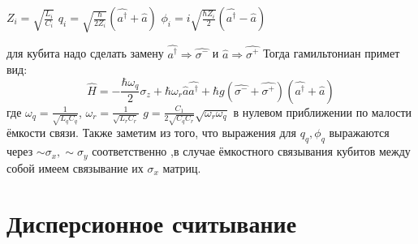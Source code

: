 \documentclass[12pt, twoside]{report}
\begin{document}
\begin{center}
$Z_i=\sqrt{\frac{L_i}{C_i}}$
$q_i=\sqrt{\frac{\hbar}{2Z_i}}(\hat{a^{\dagger}}+\hat{a})$
$\phi_i=i\sqrt{\frac{\hbar Z_i}{2}}(\hat{a^{\dagger}}-\hat{a})$ \\ 
\end{center}
для кубита надо сделать замену  $\hat{a^{\dagger}}\Rightarrow \hat{\sigma^-} $ и
 $\hat{a}\Rightarrow \hat{\sigma^+}$ 
Тогда гамильтониан примет вид:
\begin{equation}
\hat{H}=-\frac{\hbar\omega_q }{2}\sigma_z+\hbar\omega_r\hat{a}\hat{a^{\dagger}}+\hbar g 
(\hat{\sigma^-}+\hat{\sigma^+})(\hat{a^{\dagger}}+\hat{a})
\label{eq:Jc}
\end{equation}
где $\omega_q=\frac{1}{\sqrt{L_qC_q}}$,
$\omega_r=\frac{1}{\sqrt{L_rC_r}}$
$g=\frac{C_1}{2\sqrt{C_qC_r}}\sqrt{\omega_r\omega_q}$ в нулевом приближении по малости ёмкости связи.
Также заметим из того, что выражения для $q_q , \phi_q$ выражаются через $\sim \sigma_x ,\sim \sigma_y$ соответственно
,в случае ёмкостного связывания кубитов между собой имеем связывание их $\sigma_x$  матриц.

\section{Дисперсионное считывание}
\end{document}
